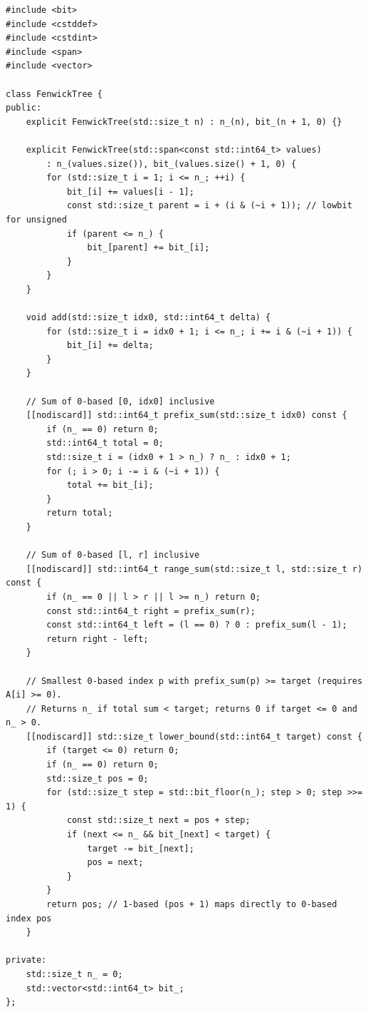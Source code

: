 \documentclass[11pt,a4paper]{article}
\theoremstyle{definition}
\begin{document}
\begin{lstlisting}[caption={1-based internal Fenwick Tree with $O(N)$ linear construction and $O(\log N)$ binary lifting.}]
#include <bit>
#include <cstddef>
#include <cstdint>
#include <span>
#include <vector>

class FenwickTree {
public:
    explicit FenwickTree(std::size_t n) : n_(n), bit_(n + 1, 0) {}

    explicit FenwickTree(std::span<const std::int64_t> values)
        : n_(values.size()), bit_(values.size() + 1, 0) {
        for (std::size_t i = 1; i <= n_; ++i) {
            bit_[i] += values[i - 1];
            const std::size_t parent = i + (i & (~i + 1)); // lowbit for unsigned
            if (parent <= n_) {
                bit_[parent] += bit_[i];
            }
        }
    }

    void add(std::size_t idx0, std::int64_t delta) {
        for (std::size_t i = idx0 + 1; i <= n_; i += i & (~i + 1)) {
            bit_[i] += delta;
        }
    }

    // Sum of 0-based [0, idx0] inclusive
    [[nodiscard]] std::int64_t prefix_sum(std::size_t idx0) const {
        if (n_ == 0) return 0;
        std::int64_t total = 0;
        std::size_t i = (idx0 + 1 > n_) ? n_ : idx0 + 1;
        for (; i > 0; i -= i & (~i + 1)) {
            total += bit_[i];
        }
        return total;
    }

    // Sum of 0-based [l, r] inclusive
    [[nodiscard]] std::int64_t range_sum(std::size_t l, std::size_t r) const {
        if (n_ == 0 || l > r || l >= n_) return 0;
        const std::int64_t right = prefix_sum(r);
        const std::int64_t left = (l == 0) ? 0 : prefix_sum(l - 1);
        return right - left;
    }

    // Smallest 0-based index p with prefix_sum(p) >= target (requires A[i] >= 0).
    // Returns n_ if total sum < target; returns 0 if target <= 0 and n_ > 0.
    [[nodiscard]] std::size_t lower_bound(std::int64_t target) const {
        if (target <= 0) return 0;
        if (n_ == 0) return 0;
        std::size_t pos = 0;
        for (std::size_t step = std::bit_floor(n_); step > 0; step >>= 1) {
            const std::size_t next = pos + step;
            if (next <= n_ && bit_[next] < target) {
                target -= bit_[next];
                pos = next;
            }
        }
        return pos; // 1-based (pos + 1) maps directly to 0-based index pos
    }

private:
    std::size_t n_ = 0;
    std::vector<std::int64_t> bit_;
};
\end{lstlisting}
\end{document}
